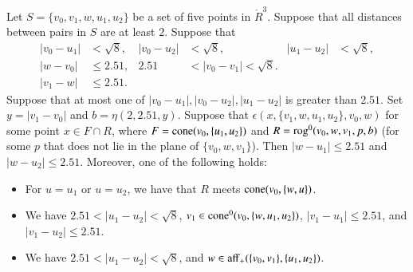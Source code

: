 \newpage

\begin{lemma}
 Let $S=\{v_0,v_1,w,u_1,u_2\}$ be a set of five points
in $\ring{R}^3$.  
Suppose that all distances between pairs in $S$ are at least $2$.
Suppose that 
   $$
   \begin{array}{rlrlrll}
   |v_0-u_1|&<\sqrt8,& |v_0-u_2|&<\sqrt8,& |u_1-u_2|&<\sqrt8,\\
   |w-v_0|&\le 2.51, &2.51&<|v_0-v_1|<\sqrt8.\\
   |v_1-w|&\le 2.51.
   \end{array}
   $$
Suppose that at most one of $|v_0-u_1|,|v_0-u_2|,|u_1-u_2|$ is
greater than $2.51$.
%
Set $y=|v_1-v_0|$ and $b=\eta(2,2.51,y)$.
Suppose that $\epsilon(x,\{v_1,w,u_1,u_2\},v_0,w)$ for some point
$x\in F\cap R$, where $F={\operatorname{cone}}(v_0,\{u_1,u_2\})$ and
$R={\operatorname{rog}}^0(v_0,w,v_1,p,b)$ (for some $p$ that
does not lie in the plane of $\{v_0,w,v_1\}$).
Then $|w-u_1|\le 2.51$ and  $|w-u_2|\le 2.51$.
Moreover, one of the following holds:
  \begin{itemize}
  \item
  For $u=u_1$ or $u=u_2$, we have that
  $R$ meets ${\operatorname{cone}}(v_0,\{w,u\})$.
  \item  We have $2.51<|u_1-u_2|<\sqrt8$, 
  $v_1\in{\operatorname{cone}}^0(v_0,\{w,u_1,u_2\})$, 
  $|v_1-u_1|\le 2.51$, and $|v_1-u_2|\le 2.51$.
  \item  We have $2.51<|u_1-u_2|<\sqrt8$, and 
  $w\in{\operatorname{aff}}_+(\{v_0,v_1\},\{u_1,u_2\})$.
  \end{itemize}
\end{lemma}


